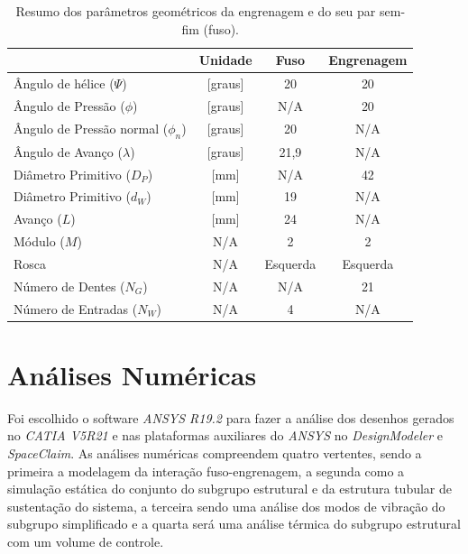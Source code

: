 \begin{table}[!htb]
     \centering
     \caption{Resumo dos parâmetros geométricos da engrenagem e do seu par sem-fim (fuso).}
    \centering
     \begin{tabular}{|l|c|c|c|}
     \rowcolor[HTML]{A8DADC}
       \hline
       \multicolumn{1}{|c|}{\textbf{Parâmetro}} &
      \multicolumn{1}{c|}{\textbf{Unidade}} &
       \textbf{Fuso} &
        \textbf{Engrenagem} \\ \hline
        Ângulo de hélice ($\Psi$) & [graus] & 20 & 20 \\ \hline
        Ângulo de Pressão ($\phi$) & [graus] & N/A & 20 \\ \hline
        Ângulo de Pressão normal ($\phi_n$) &[graus] & 20 & N/A \\ \hline
        Ângulo de Avanço ($\lambda$) & [graus]& 21,9 & N/A \\ \hline
        Diâmetro Primitivo ($D_P$) & [mm] & N/A & 42 \\ \hline
        Diâmetro Primitivo ($d_W$) & [mm] & 19 & N/A \\ \hline
        Avanço ($L$) & [mm]& 24 & N/A \\ \hline
        Módulo ($M$) & N/A & 2 & 2 \\ \hline
        Rosca & \multicolumn{1}{c|}{N/A} & Esquerda & Esquerda \\ \hline
        Número de Dentes ($N_G$) & \multicolumn{1}{c|}{N/A} & N/A & 21 \\ \hline
        Número de Entradas ($N_W$) & \multicolumn{1}{c|}{N/A} & 4 & N/A \\ \hline
        \end{tabular}
     \label{tab:resumo_p}
     
\end{table}


\section{Análises Numéricas}

Foi escolhido o software \textit{ANSYS R19.2} para fazer a análise dos desenhos gerados no \textit{CATIA V5R21} e nas plataformas auxiliares do \textit{ANSYS} no \textit{DesignModeler} e \textit{SpaceClaim}. As análises numéricas compreendem quatro vertentes, sendo a primeira a modelagem da interação fuso-engrenagem, a segunda como a simulação estática do conjunto do subgrupo estrutural e da estrutura tubular de sustentação do sistema, a terceira sendo  uma análise dos modos de vibração do subgrupo simplificado e a quarta será uma análise térmica do subgrupo estrutural com um volume de controle.


